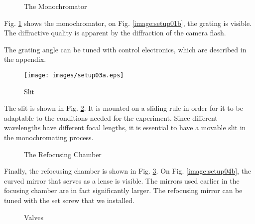 \documentclass[a4paper,10pt]{article}
\begin{document}
\begin{figure}[htbp]
  \begin{center}
  \end{center}
  \caption{The Monochromator}
  \label{image:setup01}
\end{figure}

    Fig. \ref{image:setup01} shows the monochromator, on Fig.
\ref{image:setup01b}, the grating is visible. The diffractive quality is
apparent by the diffraction of the camera flash.

    The grating angle can be tuned with control electronics, which are
described in the appendix.

\begin{figure}[htbp]
    \centering
      \texttt{[image: images/setup03a.eps]}
    \caption{Slit}
  \label{image:setup03a}
\end{figure}

    The slit is shown in Fig. \ref{image:setup03a}. It is mounted on a
sliding rule in order for it to be adaptable to the conditions needed for the
experiment. Since different wavelengths have different focal lengths, it is
essential to have a movable slit in the monochromating process.

\begin{figure}[htbp]
  \begin{center}
  \end{center}
  \caption{The Refocusing Chamber}
  \label{image:setup04}
\end{figure}

    Finally, the refocusing chamber is shown in Fig. \ref{image:setup04}. On
Fig. \ref{image:setup04b}, the curved mirror that serves as a lense is visible.
The mirrors used earlier in the focusing chamber are in fact significantly
larger. The refocusing mirror can be tuned with the set screw that we installed.

\begin{figure}[htbp]
  \begin{center}
  \end{center}
  \caption{Valves}
  \label{image:setup02}
\end{figure}
\end{document}
